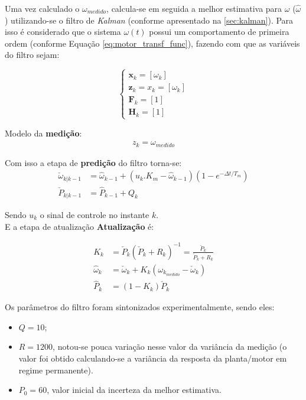 Uma vez calculado o $\omega_{medido}$, calcula-se em 
seguida a melhor estimativa para $\omega$ ($\hat{\omega}$) 
utilizando-se o filtro de \emph{Kalman} (conforme apresentado na \autoref{sec:kalman}). 
Para isso é considerado que o sistema $\omega(t)$ possui um comportamento de primeira ordem 
(conforme Equação \ref{eq:motor_transf_func}), fazendo com que as variáveis do filtro sejam:

\begin{equation*}
\begin{cases}
    \textbf{x}_k = \left[ \omega_k \right]\\
    \textbf{z}_k = x_k = [\omega_k]\\
    \textbf{F}_k = [1]\\
    \textbf{H}_k = [1]
\end{cases}
\end{equation*}

Modelo da \textbf{medição}:
\begin{align*}
z_k = \omega_{medido}
\end{align*}

Com isso a etapa de \textbf{predição} do filtro torna-se:
\begin{align*}
    \check{\omega}_{k|k-1} &= \hat{\omega}_{k-1} + (u_k.K_m - \hat{\omega}_{k-1})\left( 1 - e^{-\Delta{t}/T_m} \right)\\
    \check{P}_{k|k-1} &= \hat{P}_{k-1} + Q_k
\end{align*}

Sendo $u_k$ o sinal de controle no instante $k$.\\

E a etapa de atualização \textbf{Atualização} é:

\begin{align*}
K_k &= \check{P}_k \left( \check{P}_k + R_k \right)^{-1} = \frac{\check{P}_k}{\check{P}_k + R_k}\\
\hat{\omega}_k &= \check{\omega}_k + K_k \left( \omega_{k_{medido}} - \check{\omega}_k \right)\\
\hat{P}_k &= \left( 1 - K_k \right) \check{P}_k
\end{align*}

Os parâmetros do filtro foram sintonizados experimentalmente, sendo eles:

\begin{itemize}
    \item $Q = 10$;
    \item $R = 1200$, notou-se pouca variação nesse valor da variância da medição (o valor foi obtido calculando-se a variância da resposta da planta/motor em regime permanente).
    \item $P_0 = 60$, valor inicial da incerteza da melhor estimativa.
\end{itemize}


